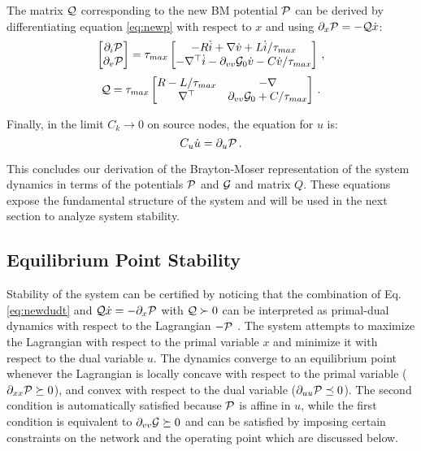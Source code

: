 \documentclass[letterpaper, 10 pt, conference]{ieeeconf}
\begin{document}
The matrix ${\cal Q}$ corresponding to the new BM potential ${\cal P}$ can be derived by differentiating equation \eqref{eq:newp} with respect to $x$ and using $\partial_x {\cal P} = -{\cal Q} \dot{x}$:
\begin{equation}
 	\begin{bmatrix}
     \partial_i {\cal P} \\
     \partial_v {\cal P}
    \end{bmatrix} = 
    \tau_{max}\begin{bmatrix}
     -R \dot i + \nabla \dot{v} + L\dot{i}/\tau_{max} \\
     -\nabla^\top \dot{i} - \partial_{vv}{\cal G}_0 \dot v - C \dot{v}/\tau_{max}
    \end{bmatrix}\,,
\end{equation}
\begin{equation}\label{eq:Qeq}
	{\cal Q} =
    \tau_{max}\begin{bmatrix}
	R - L/\tau_{max} & -\nabla\\
    \nabla^\top & \partial_{vv}{\cal G}_0 + C/\tau_{max}
\end{bmatrix}\,.
\end{equation}

Finally, in the limit $C_k \to 0$ on source nodes, the equation for $u$ is:
\begin{equation}\label{eq:newdudt}
    C_u \dot{u} = \partial_u {\cal P}\,.
\end{equation}

This concludes our derivation of the Brayton-Moser representation of the system dynamics in terms of the potentials ${\cal P}$ and ${\cal G}$ and matrix $Q$. These equations expose the fundamental structure of the system and will be used in the next section to analyze system stability.

\subsection{Equilibrium Point Stability}

Stability of the system can be certified by noticing that the combination of Eq. \eqref{eq:newdudt} and ${\cal Q}\dot{x} = -\partial_x {\cal P}$ with ${\cal Q}\succ 0$ can be interpreted as primal-dual dynamics with respect to the Lagrangian $-{\cal P}$ \cite{Feijer:2010ia}. The system attempts to maximize the Lagrangian with respect to the primal variable $x$ and minimize it with respect to the dual variable $u$. The dynamics converge to an equilibrium point whenever the Lagrangian is locally concave with respect to the primal variable (${\partial}_{xx} {\cal P} \succeq 0$), and convex with respect to the dual variable ($\partial_{uu}{\cal P} \preceq 0$). The second condition is automatically satisfied because ${\cal P}$ is affine in $u$, while the first condition is equivalent to $\partial_{vv} {\cal G} \succeq 0$ and can be satisfied by imposing certain constraints on the network and the operating point which are discussed below.
\end{document}
